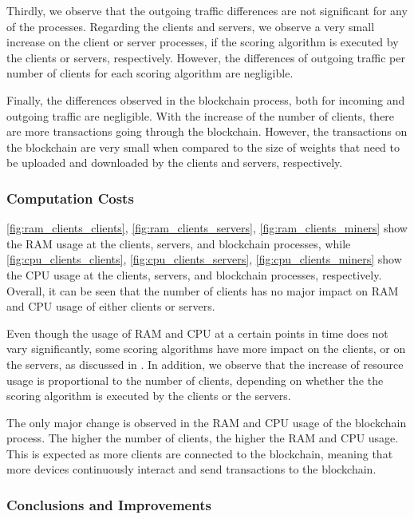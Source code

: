 Thirdly, we observe that the outgoing traffic differences are not significant for any of the processes. Regarding the clients and servers, we observe a very small increase on the client or server processes, if the scoring algorithm is executed by the clients or servers, respectively. However, the differences of outgoing traffic per number of clients for each scoring algorithm are negligible.

Finally, the differences observed in the blockchain process, both for incoming and outgoing traffic are negligible. With the increase of the number of clients, there are more transactions going through the blockchain. However, the transactions on the blockchain are very small when compared to the size of weights that need to be uploaded and downloaded by the clients and servers, respectively.

\subsubsection{Computation Costs}

\autoref{fig:ram_clients_clients}, \autoref{fig:ram_clients_servers}, \autoref{fig:ram_clients_miners} show the RAM usage at the clients, servers, and blockchain processes, while  \autoref{fig:cpu_clients_clients}, \autoref{fig:cpu_clients_servers}, \autoref{fig:cpu_clients_miners} show the CPU usage at the clients, servers, and blockchain processes, respectively. Overall, it can be seen that the number of clients has no major impact on RAM and CPU usage of either clients or servers.

Even though the usage of RAM and CPU at a certain points in time does not vary significantly, some scoring algorithms have more impact on the clients, or on the servers, as discussed in . In addition, we observe that the increase of resource usage is proportional to the number of clients, depending on whether the the scoring algorithm is executed by the clients or the servers.

The only major change is observed in the RAM and CPU usage of the blockchain process. The higher the number of clients, the higher the RAM and CPU usage. This is expected as more clients are connected to the blockchain, meaning that more devices continuously interact and send transactions to the blockchain.

\subsubsection{Conclusions and Improvements}

